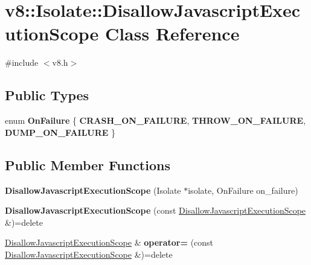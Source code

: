 \hypertarget{classv8_1_1Isolate_1_1DisallowJavascriptExecutionScope}{}\section{v8\+:\+:Isolate\+:\+:Disallow\+Javascript\+Execution\+Scope Class Reference}
\label{classv8_1_1Isolate_1_1DisallowJavascriptExecutionScope}


{\ttfamily \#include $<$v8.\+h$>$}

\subsection*{Public Types}
\begin{DoxyCompactItemize}
\item 
\mbox{\label{classv8_1_1Isolate_1_1DisallowJavascriptExecutionScope_aeb586bef085fba34f97c09afd07ea843}} 
enum {\bfseries On\+Failure} \{ {\bfseries C\+R\+A\+S\+H\+\_\+\+O\+N\+\_\+\+F\+A\+I\+L\+U\+RE}, 
{\bfseries T\+H\+R\+O\+W\+\_\+\+O\+N\+\_\+\+F\+A\+I\+L\+U\+RE}, 
{\bfseries D\+U\+M\+P\+\_\+\+O\+N\+\_\+\+F\+A\+I\+L\+U\+RE}
 \}
\end{DoxyCompactItemize}
\subsection*{Public Member Functions}
\begin{DoxyCompactItemize}
\item 
\mbox{\label{classv8_1_1Isolate_1_1DisallowJavascriptExecutionScope_a64813f7832ddca3014a7b98730a13948}} 
{\bfseries Disallow\+Javascript\+Execution\+Scope} (Isolate $\ast$isolate, On\+Failure on\+\_\+failure)
\item 
\mbox{\label{classv8_1_1Isolate_1_1DisallowJavascriptExecutionScope_a9a0c43b82fe8d0583b7af67af8aa5a33}} 
{\bfseries Disallow\+Javascript\+Execution\+Scope} (const \mbox{\hyperlink{classv8_1_1Isolate_1_1DisallowJavascriptExecutionScope}{Disallow\+Javascript\+Execution\+Scope}} \&)=delete
\item 
\mbox{\label{classv8_1_1Isolate_1_1DisallowJavascriptExecutionScope_a3cab43acfb1e7912dfeddd280750b912}} 
\mbox{\hyperlink{classv8_1_1Isolate_1_1DisallowJavascriptExecutionScope}{Disallow\+Javascript\+Execution\+Scope}} \& {\bfseries operator=} (const \mbox{\hyperlink{classv8_1_1Isolate_1_1DisallowJavascriptExecutionScope}{Disallow\+Javascript\+Execution\+Scope}} \&)=delete
\end{DoxyCompactItemize}


